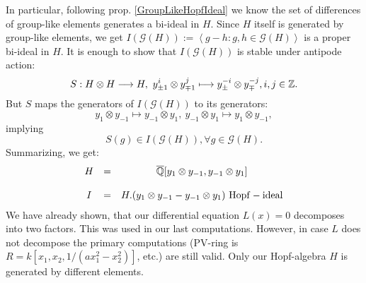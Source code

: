 In particular, following prop. \ref{GroupLikeHopfIdeal} we know the set of differences of group-like elements generates a bi-ideal in $H$. Since $H$ itself is generated by group-like elements, we get $I(\mathcal{G}(H)) := \left<g - h : g, h \in \mathcal{G}(H)\right>$ is a proper bi-ideal in $H$. It is enough to show that $I(\mathcal{G}(H))$ is stable under antipode action:
$$S : H \otimes H \longrightarrow H,\ y_{\pm 1}^i \otimes y_{\mp 1}^j \longmapsto y_{\pm}^{-i} \otimes y_{\mp}^{-j}, i, j \in \mathbb{Z}.$$
But $S$ maps the generators of $I(\mathcal{G}(H))$ to its generators:
$$y_1 \otimes y_{-1} \longmapsto y_{-1} \otimes y_1,\ y_{-1} \otimes y_1 \longmapsto y_1 \otimes y_{-1},$$
implying
$$S(g) \in I(\mathcal{G}(H)), \forall g \in \mathcal{G}(H).$$
Summarizing, we get:
$$\bao{ccc}
H &=& \currfield[y_1 \otimes y_{-1},y_{-1} \otimes y_1]\\
&&\\
I &=& H.(y_1 \otimes y_{-1} - y_{-1} \otimes y_1) \ \trm{Hopf-ideal}\\
\ea$$
We have already shown, that our differential equation $L(x) = 0$ decomposes into two factors. This was used in our last computations. However, in case $L$ does not decompose the primary computations (PV-ring is $R = k[x_1,x_2,1/(a x_1^2 - x_2^2)]$, etc.) are still valid. Only our Hopf-algebra $H$ is generated by different elements.
%
